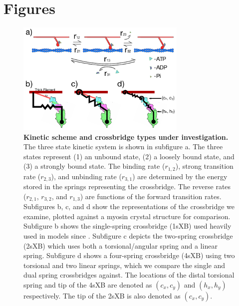 \documentclass[]{article}
\begin{document}


\clearpage
\section*{Figures} %

\begin{figure}[htbp]
    \begin{center}
    \includegraphics[width=3.2in]{../imgs/Figure1.pdf}
    \caption{
        \label{fig_xb_types}
        \textbf{Kinetic scheme and crossbridge types under investigation.} 
        The three state kinetic system is shown in subfigure a. 
        The three states represent (1) an unbound state, (2) a loosely bound state, and (3) a strongly bound state. 
        The binding rate ($r_{1,2}$), strong transition rate ($r_{2,3}$), and unbinding rate ($r_{3,1}$) are determined by the energy stored in the springs representing the crossbridge. 
        The reverse rates ($r_{2,1}$, $r_{3,2}$, and $r_{1,3}$) are functions of the forward transition rates.
        Subfigures b, c, and d show the representations of the crossbridge we examine, plotted against a myosin crystal structure for comparison. 
        Subfigure b shows the single-spring crossbridge (1sXB) used heavily used in models since \protect\citep{Huxley1957}. 
        Subfigure c depicts the two-spring crossbridge (2sXB) which uses both a torsional/angular spring and a linear spring. 
        Subfigure d shows a four-spring crossbridge (4sXB) using two torsional and two linear springs, which we compare the single and dual spring crossbridges against.
        The locations of the distal torsional spring and tip of the 4sXB are denoted as $(c_x, c_y)$ and $(h_x, h_y)$ respectively. 
        The tip of the 2sXB is also denoted as $(c_x, c_y)$.
    }
    \end{center}
\end{figure}
\end{document}
